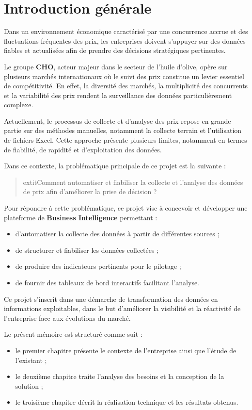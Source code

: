 \chapter*{Introduction générale}

Dans un environnement économique caractérisé par une concurrence accrue et des fluctuations fréquentes des prix, les entreprises doivent s'appuyer sur des données fiables et actualisées afin de prendre des décisions stratégiques pertinentes.

Le groupe \textbf{CHO}, acteur majeur dans le secteur de l'huile d'olive, opère sur plusieurs marchés internationaux où le suivi des prix constitue un levier essentiel de compétitivité. En effet, la diversité des marchés, la multiplicité des concurrents et la variabilité des prix rendent la surveillance des données particulièrement complexe.

Actuellement, le processus de collecte et d'analyse des prix repose en grande partie sur des méthodes manuelles, notamment la collecte terrain et l'utilisation de fichiers Excel. Cette approche présente plusieurs limites, notamment en termes de fiabilité, de rapidité et d'exploitation des données.

Dans ce contexte, la problématique principale de ce projet est la suivante :

\begin{quote}
	extit{Comment automatiser et fiabiliser la collecte et l'analyse des données de prix afin d'améliorer la prise de décision ?}
\end{quote}

Pour répondre à cette problématique, ce projet vise à concevoir et développer une plateforme de \textbf{Business Intelligence} permettant :

\begin{itemize}[leftmargin=1.2cm]
	\item d'automatiser la collecte des données à partir de différentes sources ;
	\item de structurer et fiabiliser les données collectées ;
	\item de produire des indicateurs pertinents pour le pilotage ;
	\item de fournir des tableaux de bord interactifs facilitant l'analyse.
\end{itemize}

Ce projet s'inscrit dans une démarche de transformation des données en informations exploitables, dans le but d'améliorer la visibilité et la réactivité de l'entreprise face aux évolutions du marché.

Le présent mémoire est structuré comme suit :

\begin{itemize}[leftmargin=1.2cm]
	\item le premier chapitre présente le contexte de l'entreprise ainsi que l'étude de l'existant ;
	\item le deuxième chapitre traite l'analyse des besoins et la conception de la solution ;
	\item le troisième chapitre décrit la réalisation technique et les résultats obtenus.
\end{itemize}

\clearpage

